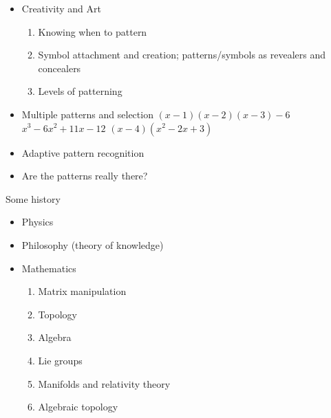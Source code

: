 \documentclass{slides}
\begin{document}
\begin{slide}{}


\begin{itemize}
	\item Creativity and Art
	\begin{enumerate}
		\item Knowing when to pattern
		\item Symbol attachment and creation; \newline 
			patterns/symbols as revealers and \newline
			concealers
		\item Levels of patterning
	\end{enumerate}
	\item Multiple patterns and selection \newline
		$ (x - 1)(x - 2)(x - 3) - 6 $ \newline
		$ x^3 - 6x^2 + 11x - 12 $ \newline
		$ (x - 4)(x^2 - 2x + 3) $
	\item Adaptive pattern recognition
	\item Are the patterns really there?
\end{itemize}

\end{slide}

\begin{slide}{}

{\large Some history }

\begin{itemize}
	\item Physics
	\item Philosophy (theory of knowledge)
	\item Mathematics
	\begin{enumerate}
		\item Matrix manipulation
		\item Topology
		\item Algebra
		\item Lie groups
		\item Manifolds and relativity theory
		\item Algebraic topology
	\end{enumerate}
\end{itemize}

\end{slide}
\end{document}
